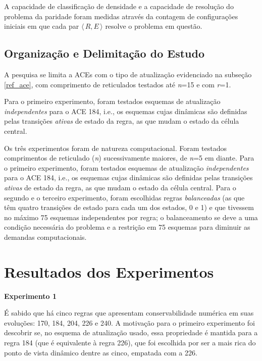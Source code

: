 \documentclass[a4paper,12pt]{ltxdoc}
\newcommand\tab[1][1cm]{\hspace*{#1}}
\begin{document}
\tab A capacidade de classificação de densidade e a capacidade de resolução do problema da paridade foram medidas através da contagem de configurações iniciais em que cada par $\langle\,R,E\,\rangle$ resolve o problema em questão.

\subsection{Organização e Delimitação do Estudo} \label{delimitacao}

A pesquisa se limita a ACEs com o tipo de atualização evidenciado na subseção \ref{ref_ace}, com comprimento de reticulados testados até \textit{n}=15 e com \textit{r}=1. 

\tab Para o primeiro experimento, foram testados esquemas de atualização \textit{independentes} para o ACE 184, i.e., os esquemas cujas dinâmicas são definidas pelas transições \textit{ativas} de estado da regra, as que mudam o estado da célula central. 

\tab Os três experimentos foram de natureza computacional. Foram testados comprimentos de reticulado (\textit{n}) sucessivamente maiores, de \textit{n}=5 em diante. Para o primeiro experimento, foram testados esquemas de atualização \textit{independentes} para o ACE 184, i.e., os esquemas cujas dinâmicas são definidas pelas transições \textit{ativas} de estado da regra, as que mudam o estado da célula central. Para o segundo e o terceiro experimento, foram escolhidas regras \textit{balanceadas} (as que têm quatro transições de estado para cada um dos estados, 0 e 1) e que tivessem no máximo 75 esquemas independentes por regra; o balanceamento se deve a uma condição necessária do problema e a restrição em 75 esquemas para diminuir as demandas computacionais.

\break
\section{Resultados dos Experimentos} \label{resultados}

\textbf{Experimento 1}

\tab É sabido que há cinco regras que apresentam conservabilidade numérica em suas evoluções: 170, 184, 204, 226 e 240. A motivação para o primeiro experimento foi descobrir se, no esquema de atualização usado, essa propriedade é mantida para a regra 184 (que é equivalente à regra 226), que foi escolhida por ser a mais rica do ponto de vista dinâmico dentre as cinco, empatada com a 226.
\end{document}
